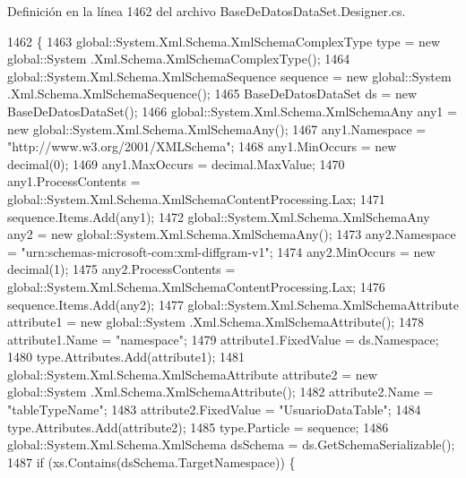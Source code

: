 Definición en la línea 1462 del archivo Base\-De\-Datos\-Data\-Set.\-Designer.\-cs.


\begin{DoxyCode}
1462                                                                                                            
                               \{
1463                 global::System.Xml.Schema.XmlSchemaComplexType type = \textcolor{keyword}{new} global::System
      .Xml.Schema.XmlSchemaComplexType();
1464                 global::System.Xml.Schema.XmlSchemaSequence sequence = \textcolor{keyword}{new} global::System
      .Xml.Schema.XmlSchemaSequence();
1465                 BaseDeDatosDataSet ds = \textcolor{keyword}{new} BaseDeDatosDataSet();
1466                 global::System.Xml.Schema.XmlSchemaAny any1 = \textcolor{keyword}{new} global::System.Xml.Schema.XmlSchemaAny();
1467                 any1.Namespace = \textcolor{stringliteral}{"http://www.w3.org/2001/XMLSchema"};
1468                 any1.MinOccurs = \textcolor{keyword}{new} decimal(0);
1469                 any1.MaxOccurs = decimal.MaxValue;
1470                 any1.ProcessContents = global::System.Xml.Schema.XmlSchemaContentProcessing.Lax;
1471                 sequence.Items.Add(any1);
1472                 global::System.Xml.Schema.XmlSchemaAny any2 = \textcolor{keyword}{new} global::System.Xml.Schema.XmlSchemaAny();
1473                 any2.Namespace = \textcolor{stringliteral}{"urn:schemas-microsoft-com:xml-diffgram-v1"};
1474                 any2.MinOccurs = \textcolor{keyword}{new} decimal(1);
1475                 any2.ProcessContents = global::System.Xml.Schema.XmlSchemaContentProcessing.Lax;
1476                 sequence.Items.Add(any2);
1477                 global::System.Xml.Schema.XmlSchemaAttribute attribute1 = \textcolor{keyword}{new} global::System
      .Xml.Schema.XmlSchemaAttribute();
1478                 attribute1.Name = \textcolor{stringliteral}{"namespace"};
1479                 attribute1.FixedValue = ds.Namespace;
1480                 type.Attributes.Add(attribute1);
1481                 global::System.Xml.Schema.XmlSchemaAttribute attribute2 = \textcolor{keyword}{new} global::System
      .Xml.Schema.XmlSchemaAttribute();
1482                 attribute2.Name = \textcolor{stringliteral}{"tableTypeName"};
1483                 attribute2.FixedValue = \textcolor{stringliteral}{"UsuarioDataTable"};
1484                 type.Attributes.Add(attribute2);
1485                 type.Particle = sequence;
1486                 global::System.Xml.Schema.XmlSchema dsSchema = ds.GetSchemaSerializable();
1487                 \textcolor{keywordflow}{if} (xs.Contains(dsSchema.TargetNamespace)) \{

\end{DoxyCode}
